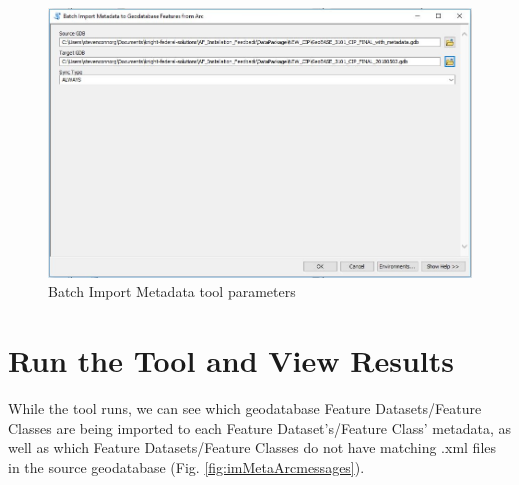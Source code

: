 \documentclass[openany]{book}
\theoremstyle{definition}
\theoremstyle{definition}
\theoremstyle{definition}
\theoremstyle{remark}
\begin{document}
\begin{figure}[H]

{\centering \includegraphics{figures/imMetaArc-params} 

}

\caption{Batch Import Metadata tool parameters}\label{fig:imMetaArcparams}
\end{figure}

\section{Run the Tool and View
Results}\label{run-the-tool-and-view-results-12}

While the tool runs, we can see which geodatabase Feature
Datasets/Feature Classes are being imported to each Feature
Dataset's/Feature Class' metadata, as well as which Feature
Datasets/Feature Classes do not have matching .xml files in the source
geodatabase (Fig. \ref{fig:imMetaArcmessages}).
\end{document}
